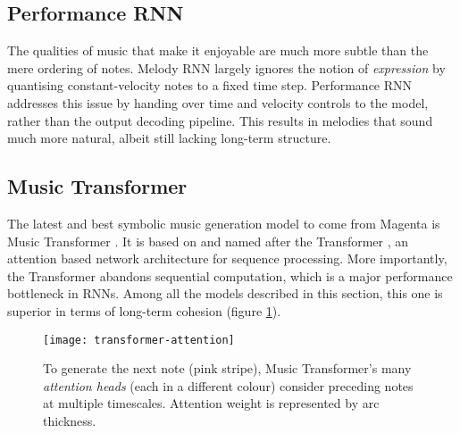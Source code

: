 \documentclass[../../report.tex]{subfiles}
\begin{document}
\subsection{Performance RNN}

The qualities of music that make it enjoyable are much more subtle than the mere
ordering of notes. Melody RNN largely ignores the notion of \emph{expression} by
quantising constant-velocity\footnotemark{} notes to a fixed time step.
Performance RNN \cite{Simon2017} addresses this issue by handing over time and
velocity controls to the model, rather than the output decoding pipeline. This
results in melodies that sound much more natural, albeit still lacking long-term
structure.


\subsection{Music Transformer}

The latest and best symbolic music generation model to come from Magenta is
Music Transformer \cite{Huang2018}. It is based on and named after the
Transformer \cite{Vaswani2017}, an attention based network architecture for
sequence processing. More importantly, the Transformer abandons sequential
computation, which is a major performance bottleneck in RNNs. Among all the
models described in this section, this one is superior in terms of long-term
cohesion (figure \ref{fig:transformer-attention}).

\begin{figure}
  \centering
  \texttt{[image: transformer-attention]}
  \caption{To generate the next note (pink stripe), Music Transformer's many
  \emph{attention heads} (each in a different colour) consider preceding notes
  at multiple timescales. Attention weight is represented by arc thickness.
  \cite{Huang2018Visual}}
  \label{fig:transformer-attention}
\end{figure}
\end{document}
